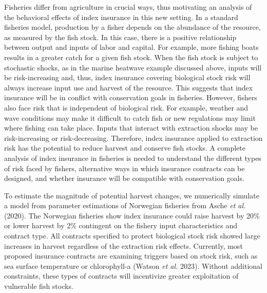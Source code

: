 \documentclass[
  letterpaper,
  DIV=11,
  numbers=noendperiod]{scrartcl}
\theoremstyle{plain}
\theoremstyle{plain}
\theoremstyle{remark}
\begin{document}
Fisheries differ from agriculture in crucial ways, thus motivating an
analysis of the behavioral effects of index insurance in this new
setting. In a standard fisheries model, production by a fisher depends
on the abundance of the resource, as measured by the fish stock. In this
case, there is a positive relationship between output and inputs of
labor and capital. For example, more fishing boats results in a greater
catch for a given fish stock. When the fish stock is subject to
stochastic shocks, as in the marine heatwave example discussed above,
inputs will be risk-increasing and, thus, index insurance covering
biological stock risk will always increase input use and harvest of the
resource. This suggests that index insurance will be in conflict with
conservation goals in fisheries. However, fishers also face risk that is
independent of biological risk. For example, weather and wave conditions
may make it difficult to catch fish or new regulations may limit where
fishing can take place. Inputs that interact with extraction shocks may
be risk-increasing or risk-decreasing. Therefore, index insurance
applied to extraction risk has the potential to reduce harvest and
conserve fish stocks. A complete analysis of index insurance in
fisheries is needed to understand the different types of risk faced by
fishers, alternative ways in which insurance contracts can be designed,
and whether insurance will be compatible with conservation goals.

To estimate the magnitude of potential harvest changes, we numerically
simulate a model from parameter estimations of Norwegian fisheries from
Asche \emph{et al.} (2020). The Norwegian fisheries show index insurance
could raise harvest by 20\% or lower harvest by 2\% contingent on the
fishery input characteristics and contract type. All contracts specified
to protect biological stock risk showed large increases in harvest
regardless of the extraction risk effects. Currently, most proposed
insurance contracts are examining triggers based on stock risk, such as
sea surface temperature or chlorophyll-a (Watson \emph{et al.} 2023).
Without additional constraints, these types of contracts will
incentivize greater exploitation of vulnerable fish stocks.
\end{document}
